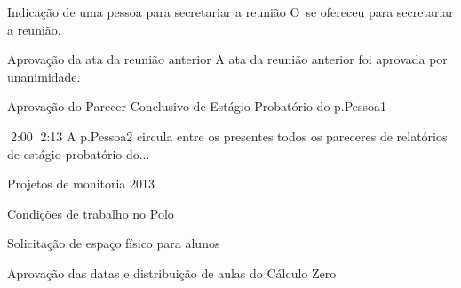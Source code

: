 \documentclass[12pt,a4paper]{ata}
\begin{document}
\begin{ponto}{Indicação de uma pessoa para secretariar a reunião}
  O~\prof \secretariou \space se ofereceu para secretariar a reunião.
\end{ponto}

\begin{ponto}{Aprovação da ata da reunião anterior}
A ata da reunião anterior foi aprovada por unanimidade.
\end{ponto}

\begin{ponto}{Aprovação do Parecer Conclusivo de Estágio Probatório do
  \prof \gls{p.Pessoa1}
}

\T{2:00} \T{2:13} A \profa \gls{p.Pessoa2} circula entre os presentes
todos os pareceres de relatórios de estágio probatório do...

\end{ponto}



\begin{ponto}{Projetos de monitoria 2013}

\dummyText

\end{ponto}

\begin{ponto}{Condições de trabalho no Polo}
	\dummyText
\end{ponto}

\begin{ponto}{Solicitação de espaço físico para alunos}
	\dummyText
\end{ponto}



\begin{ponto}{Aprovação das datas e distribuição de aulas do Cálculo Zero}
	\dummyText
\end{ponto}
\end{document}
